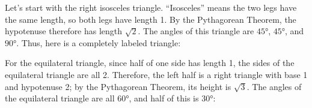 \documentclass{article}
\begin{document}
\begin{enumerate}
\begin{enumerate}
    \begin{solution}
      Let's start with the right isosceles triangle.  ``Isosceles'' means
      the two legs have the same length, so both legs have length 1.  By the
      Pythagorean Theorem, the hypotenuse therefore has length $\sqrt{2}$.
      The angles of this triangle are $\ang{45}$, $\ang{45}$, and
      $\ang{90}$.  Thus, here is a completely labeled triangle:
      \begin{center}
      \end{center}
      For the equilateral triangle, since half of one side has length 1,
      the sides of the equilateral triangle are all 2.  Therefore, the
      left half is a right triangle with base 1 and hypotenuse 2; by the
      Pythagorean Theorem, its height is $\sqrt{3}$.  The angles of the
      equilateral triangle are all $\ang{60}$, and half of this is
      $\ang{30}$:
      \begin{center}
      \end{center}
    \end{solution}


\end{enumerate}
\end{enumerate}
\end{document}
